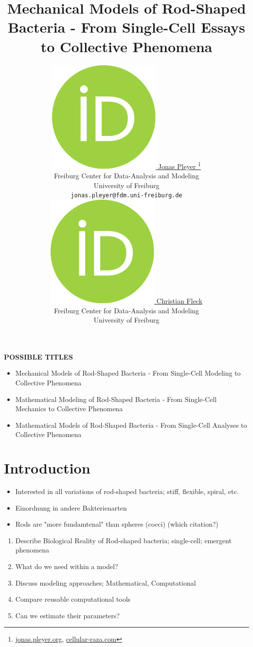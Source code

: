 \documentclass{article}
\title{Mechanical Models of Rod-Shaped Bacteria - From Single-Cell Essays to Collective Phenomena}
\author{
    \href{https://orcid.org/0009-0001-0613-7978}{
        \includegraphics[scale=0.06]{orcid.pdf}
        \hspace{1mm}Jonas Pleyer
    }
    \thanks{
        \href{https://jonas.pleyer.org}{jonas.pleyer.org},
        \href{https://cellular-raza.com}{cellular-raza.com}
    }\\
	Freiburg Center for Data-Analysis and Modeling\\
	University of Freiburg\\
	\texttt{jonas.pleyer@fdm.uni-freiburg.de} \\
	\And
	\href{https://orcid.org/0000-0002-6371-4495}{
        \includegraphics[scale=0.06]{orcid.pdf}
        \hspace{1mm}Christian Fleck
    }\\
	Freiburg Center for Data-Analysis and Modeling\\
	University of Freiburg
}
\begin{document}
\maketitle


\begin{abstract}
\end{abstract}


\textbf{POSSIBLE TITLES}
\begin{itemize}
    \item Mechanical Models of Rod-Shaped Bacteria - From Single-Cell Modeling to Collective Phenomena
    \item Mathematical Modeling of Rod-Shaped Bacteria - From Single-Cell Mechanics to Collective Phenomena
    \item Mathematical Models of Rod-Shaped Bacteria - From Single-Cell Analyses to Collective Phenomena
\end{itemize}

\tableofcontents

\section{Introduction}

\begin{itemize}
    \item Interested in all variations of rod-shaped bacteria; stiff, flexible, spiral, etc.
    \item Einordnung in andere Bakterienarten
    \item Rods are "more fundamtenal" than spheres (cocci) (which citation?)
\end{itemize}

\begin{enumerate}
    \item Describe Biological Reality of Rod-shaped bacteria; single-cell; emergent phenomena
    \item What do we need within a model?
    \item Discuss modeling approaches; Mathematical, Computational
    \item Compare reusable computational tools
    \item Can we estimate their parameters?
\end{enumerate}
\end{document}
